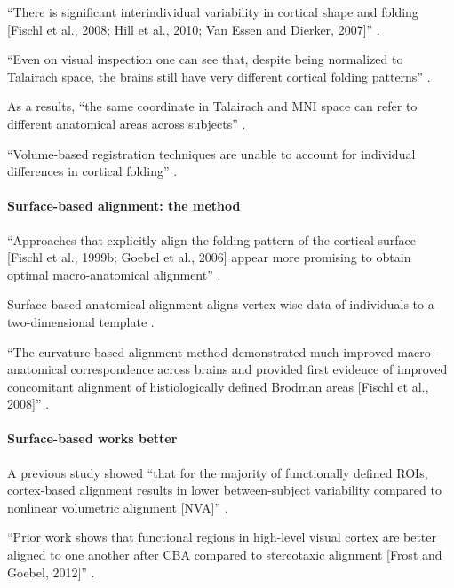 %
``There is significant interindividual variability in cortical shape and folding
[Fischl et al., 2008; Hill et al., 2010; Van Essen and Dierker, 2007]''
\citep{zhen2017quantifying}.

%
``Even on visual inspection one can see that, despite being normalized to
Talairach space, the brains still have very different cortical folding
patterns'' \citep{frost2012measuring}.

%
As a results, ``the same coordinate in Talairach and MNI space can refer to
different anatomical areas across subjects'' \citep{frost2012measuring}.

%
``Volume-based registration techniques are unable to account for individual
differences in cortical folding'' \citep{frost2012measuring}.


\paragraph{Surface-based alignment: the method}

``Approaches that explicitly align the folding pattern of the cortical surface
[Fischl et al., 1999b; Goebel et al., 2006] appear more promising to obtain
optimal macro-anatomical alignment'' \citep{frost2012measuring}.

Surface-based anatomical alignment \citep{fischl1999cortical} aligns vertex-wise
data of individuals to a two-dimensional template \citep[e.g., FreeSurfer
fsaverage template;][]{fischl1999high}.

``The curvature-based alignment method demonstrated much improved
macro-anatomical correspondence across brains and provided first evidence of
improved concomitant alignment of histiologically defined Brodman areas [Fischl
et al., 2008]'' \citep{frost2012measuring}.


\paragraph{Surface-based works better}

A previous study showed ``that for the majority of functionally defined ROIs,
cortex-based alignment results in lower between-subject variability compared to
nonlinear volumetric alignment [NVA]'' \citet{rosenke2021probabilistic}.

``Prior work shows that functional regions in high-level visual cortex are
better aligned to one another after CBA compared to stereotaxic alignment [Frost
and Goebel, 2012]'' \citep{weiner2018defining}.


